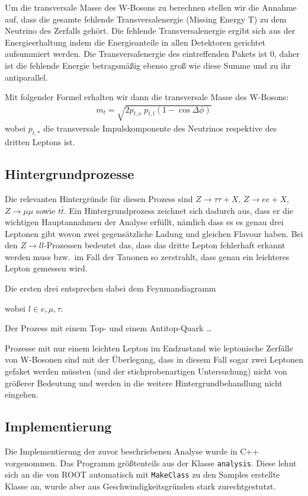 Um die transversale Masse des W-Bosons zu berechnen stellen wir die Annahme auf,
dass die gesamte fehlende Transversalenergie (Missing Energy T) zu dem Neutrino
des Zerfalls gehört. Die fehlende Transversalenergie ergibt sich aus der
Energieerhaltung indem die Energieanteile in allen Detektoren gerichtet
aufsummiert werden. Die Transversalenergie des eintreffenden Pakets ist $0$,
daher ist die fehlende Energie betragsmäßig ebenso groß wie diese Summe und zu
ihr antiparallel.

Mit folgender Formel erhalten wir dann die transversale Masse des W-Bosons: 
\begin{align}
  m_t = \sqrt{2 p_{t,\nu}\; p_{t,l} (1 - \cos{\Delta\phi})}
  \label{eqn:trans}
\end{align}
wobei $p_{t,*}$ die transversale Impulskomponente des Neutrinos respektive des
dritten Leptons ist.


\subsection{Hintergrundprozesse}
Die relevanten Hintergründe für diesen Prozess sind $Z\to\tau\tau + X$, $Z\to e
e + X$, $Z\to\mu\mu$ sowie $t\bar{t}$. Ein Hintergrundprozess zeichnet sich
dadurch aus, dass er die wichtigen Hauptannahmen der Analyse erfüllt, nämlich
dass es es genau drei Leptonen gibt wovon zwei gegensätzliche Ladung und
gleichen Flavour haben. Bei den $Z\to l l$-Prozessen bedeutet das, dass das
dritte Lepton fehlerhaft erkannt werden muss bzw.\ im Fall der Tauonen so
zerstrahlt, dass genau ein leichteres Lepton gemessen wird.


Die ersten drei entsprechen dabei dem
Feynmandiagramm
\begin{figure}[h!]
  \begin{center}
%    
  \end{center}
\end{figure}
wobei $l \in {e,\mu,\tau}$. 

Der Prozess mit einem Top- und einem Antitop-Quark \dots

Prozesse mit nur einem leichten Lepton im Endzustand wie leptonische Zerfälle
von W-Bosonen sind mit der Überlegung, dass in diesem Fall sogar zwei Leptonen
gefaket werden müssten (und der stichprobenartigen Untersuchung) nicht von
größerer Bedeutung und werden in die weitere Hintergrundbehandlung nicht
eingehen.

\subsection{Implementierung}
Die Implementierung der zuvor beschriebenen Analyse wurde in C++ vorgenommen.
Das Programm größtenteils aus der Klasse \lstinline!analysis!. Diese lehnt sich
an die von ROOT automatisch mit \lstinline!MakeClass! zu den Samples erstellte
Klasse an, wurde aber aus Geschwindigkeitsgründen stark zurechtgestutzt.

